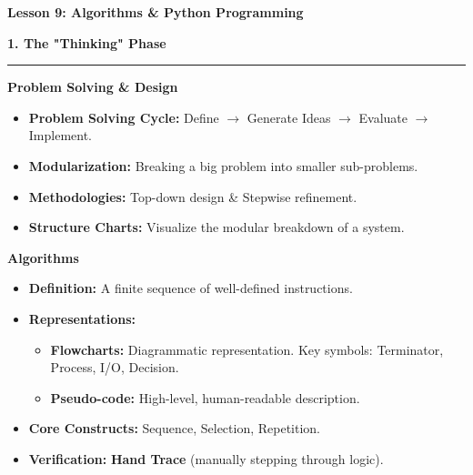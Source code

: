 \documentclass[a4paper, 8pt]{extarticle}
\newcommand{\sectionheading}[1]{\large\textbf{#1}\par\noindent\rule{\linewidth}{0.4pt}}
\newcommand{\subsectionheading}[1]{\normalsize\textbf{#1}}
\begin{document}
\pagestyle{empty} %

\begin{center}
    \fontsize{12pt}{14pt}\selectfont
    \textbf{Lesson 9: Algorithms \& Python Programming}
\end{center}
\vspace{1em}

\begin{multicols}{2}


\sectionheading{1. The "Thinking" Phase}
\vspace{0.5em}
\subsectionheading{Problem Solving & Design}
\begin{itemize}
    \item \textbf{Problem Solving Cycle:} Define $\rightarrow$ Generate Ideas $\rightarrow$ Evaluate $\rightarrow$ Implement.
    \item \textbf{Modularization:} Breaking a big problem into smaller sub-problems.
    \item \textbf{Methodologies:} Top-down design \& Stepwise refinement.
    \item \textbf{Structure Charts:} Visualize the modular breakdown of a system.
\end{itemize}

\subsectionheading{Algorithms}
\begin{itemize}
    \item \textbf{Definition:} A finite sequence of well-defined instructions.
    \item \textbf{Representations:}
    \begin{itemize}
        \item \textbf{Flowcharts:} Diagrammatic representation. Key symbols: Terminator, Process, I/O, Decision.
        \item \textbf{Pseudo-code:} High-level, human-readable description.
    \end{itemize}
    \item \textbf{Core Constructs:} Sequence, Selection, Repetition.
    \item \textbf{Verification:} \textbf{Hand Trace} (manually stepping through logic).
\end{itemize}


\end{multicols}
\end{document}
